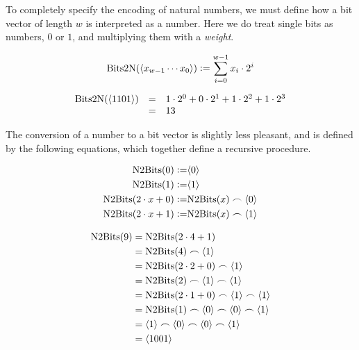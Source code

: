 To completely specify the encoding of natural numbers, we must define
how a bit vector of length $w$ is interpreted as a number.  Here we do
treat single bits as numbers, $0$ or $1$, and multiplying them with a
\emph{weight}.

\begin{definition}
\begin{align*}
    \mathrm{Bits2N}(\langle x_{w-1}\cdots x_{0} \rangle) \vcentcolon= \sum_{i=0}^{w-1} x_{i} \cdot{} 2^{i}
\end{align*}
\label{def:bits2n}
\end{definition}

\begin{example}
  \[
    \begin{array}{rcl}
      \mathrm{Bits2N}(\langle 1101 \rangle) & = & 1 \cdot 2^{0} + 0 \cdot 2^{1} + 1 \cdot 2^{2} + 1 \cdot 2^{3} \\
                               & = & 13
    \end{array}
  \]
\end{example}

The conversion of a number to a bit vector is slightly less pleasant,
and is defined by the following equations, which together define a
recursive procedure.

\begin{definition}
  \begin{align}
    \mathrm{N2Bits}(0) \vcentcolon= & \langle 0 \rangle \\
    \mathrm{N2Bits}(1) \vcentcolon= & \langle 1 \rangle \\
    \mathrm{N2Bits}(2\cdot{}x + 0) \vcentcolon= & \mathrm{N2Bits}(x)\frown\langle 0 \rangle \\
    \mathrm{N2Bits}(2\cdot{}x + 1) \vcentcolon= & \mathrm{N2Bits}(x)\frown\langle 1 \rangle
  \end{align}
\end{definition}

  \begin{example}
\begin{align*}
  \mathrm{N2Bits}(9) &= \mathrm{N2Bits}(2\cdot{}4 + 1) \\
            &= \mathrm{N2Bits}(4) \frown \langle 1 \rangle \\
            &= \mathrm{N2Bits}(2\cdot{}2 + 0) \frown \langle 1 \rangle \\
            &= \mathrm{N2Bits}(2) \frown \langle 1 \rangle \frown \langle 1 \rangle \\
            &= \mathrm{N2Bits}(2\cdot{}1 + 0) \frown \langle 1 \rangle \frown \langle 1 \rangle \\
            &= \mathrm{N2Bits}(1) \frown \langle 0 \rangle \frown \langle 0 \rangle \frown \langle 1 \rangle \\
            &= \langle 1 \rangle \frown \langle 0 \rangle \frown \langle 0 \rangle \frown \langle 1 \rangle \\
            &= \langle 1001 \rangle
\end{align*}
  \end{example}

